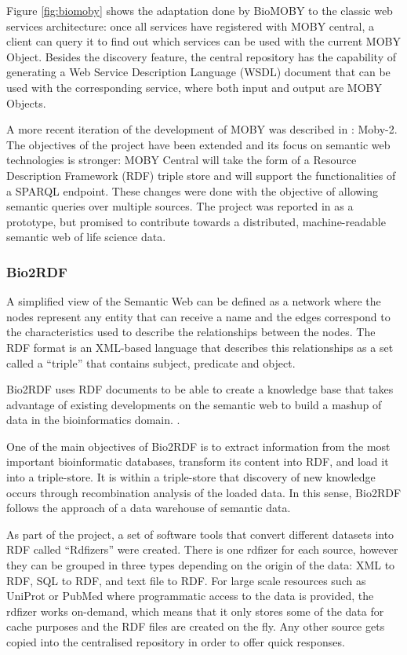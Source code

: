 Figure \ref{fig:biomoby} shows the adaptation done by BioMOBY to the classic web services architecture: once all services have registered with MOBY central, a client can query it to find out which services can be used with the current MOBY Object. Besides the discovery feature, the central repository has the capability of generating a Web Service Description Language (WSDL) document that can be used with the corresponding service, where both input and output are MOBY Objects.

A more recent iteration of the development of MOBY was described in \cite{VAN2009}: Moby-2. The objectives of the project have been extended and its focus on semantic web technologies is stronger: MOBY Central will take the form of a Resource Description Framework (RDF) triple store and will support the functionalities of a SPARQL endpoint. These changes were done with the objective of allowing semantic queries over multiple sources. The project was reported in \cite{VAN2009} as a prototype, but promised to contribute towards a distributed, machine-readable semantic web of life science data.

\subsubsection{Bio2RDF}
A simplified view of the Semantic Web can be defined as a network where the nodes represent any entity that can receive a name and the edges correspond to the characteristics used to describe the relationships between the nodes. The RDF format is an XML-based language that describes this relationships as a set called a ``triple'' that contains subject, predicate and object.

Bio2RDF uses RDF documents to be able to create a knowledge base that takes advantage of existing developments on the semantic web to build a mashup of data in the bioinformatics domain.  \cite{BEL2008}.

One of the main objectives of Bio2RDF is to extract information from the most important bioinformatic databases, transform its content into RDF, and load it into a triple-store. It is within a triple-store that discovery of new knowledge occurs through recombination analysis of the loaded data. In this sense, Bio2RDF follows the approach of a data warehouse of semantic data.

As part of the project, a set of software tools that convert different datasets into RDF called ``Rdfizers'' were created. There is one rdfizer for each source, however they can be grouped in three types depending on the origin of the data: XML to RDF, SQL to RDF, and text file to RDF. For large scale resources such as UniProt or PubMed where programmatic access to the data is provided, the rdfizer works on-demand, which means that it only stores some of the data for cache purposes and the RDF files are created on the fly. Any other source gets copied into the centralised repository in order to offer quick responses.

